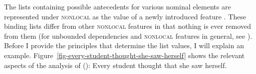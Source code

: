 \documentclass[output=paper,biblatex,babelshorthands,newtxmath,draftmode,colorlinks,citecolor=brown]{langscibook}
\begin{document}
\noindent
The lists containing possible antecedents for various nominal elements are represented under
\textsc{nonlocal} as the value of a newly introduced feature . These binding lists differ from
other \textsc{nonlocal} features in that nothing is ever removed from them (for unbounded dependencies
and \textsc{nonlocal} features in general, see ). Before I provide the principles that
determine the list values, I will explain an example.
Figure~\ref{fig-every-student-thought-she-saw-herself} shows the relevant aspects of the analysis of ():
\ea
Every student thought that she saw herself.
\z
\begin{sidewaysfigure}
\centering
\resizebox{.8\textwidth}{!}{%
\begin{forest}
[\avm{
   [ list-a  & < > \\
     list-z  & < > \\
     list-u  & < \1, \2, \3, \4, \5 >\\
     list-lu & < \1, \2, \3, \4, \5 > ] }
   [\avm{
     [ \ldots cont|conds & < \ldots, [ arg-r & \1 ], \ldots > \\
       \ldots |binding   & [ list-a  & < > \\
                             list-z  & < > \\
                             list-u  & < \1, \2, \3, \4, \5 >\\
                             list-lu & < \1 > ] ]}
     [ctx]]
   [\avm{
     [ list-a  & < \2, \3 > \\
       list-z  & < \2, \3 > \\
       list-u  & < \1, \2, \3, \4, \5 >\\
       list-lu & < \2, \3, \4, \5 > ]} 
     [\avm{
       [ \ldots anaphora & [ r-mark & \3 \\
                             var    & \2 \\ ]\\
         \ldots |binding   & [ list-a  & < \2, \3 > \\
                               list-z  & < \2, \3 > \\
                               list-u  & < \1, \2, \3, \4, \5 >\\
                               list-lu & < \2, \3 > ] ]} 
       [every student, roof]]
      [\avm{
          [ list-a  & < \2, \3 > \\
            list-z  & < \2, \3 > \\
            list-u  & < \1, \2, \3, \4, \5 >\\
}
\end{forest}}
\end{sidewaysfigure}
\end{document}
